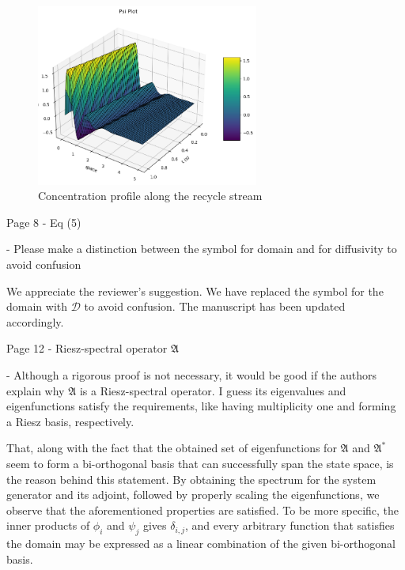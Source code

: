 \documentclass[11pt,answers]{exam}
\begin{document}
\begin{questions}
\begin{figure}[H]
    \centering
    \includegraphics[width=0.65\textwidth]{x2_vs_z.png}
    \caption{Concentration profile along the recycle stream}
    \label{fig:x2}
\end{figure}

    \question Page 8 - Eq (5)
    
    - Please make a distinction between the symbol for domain and for diffusivity to avoid confusion

    \begin{solutionorbox} \label{comment:1_7'}
        We appreciate the reviewer's suggestion. We have replaced the symbol for the domain with $\mathcal{D}$ to avoid confusion. The manuscript has been updated accordingly.
    \end{solutionorbox}


    \question Page 12 - Riesz-spectral operator $\mathfrak{A}$

    - Although a rigorous proof is not necessary, it would be good if the authors explain why $\mathfrak{A}$ is a Riesz-spectral operator. I guess its eigenvalues and eigenfunctions satisfy the requirements, like having multiplicity one and forming a Riesz basis, respectively.

    \begin{solutionorbox} \label{comment:1_8}
        That, along with the fact that the obtained set of eigenfunctions for $\mathfrak{A}$ and $\mathfrak{A}^*$ seem to form a bi-orthogonal basis that can successfully span the state space, is the reason behind this statement. By obtaining the spectrum for the system generator and its adjoint, followed by properly scaling the eigenfunctions, we observe that the aforementioned properties are satisfied. To be more specific, the inner products of $\phi_i$ and $\psi_j$ gives $\delta_{i,j}$, and every arbitrary function that satisfies the domain may be expressed as a linear combination of the given bi-orthogonal basis.
    \end{solutionorbox}



\end{questions}
\end{document}
